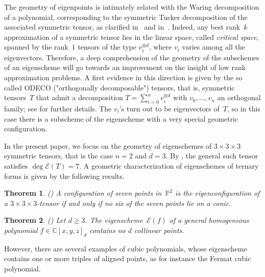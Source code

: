 \documentclass{amsart}
\theoremstyle{plain}
\newtheorem{theoremintro}{Theorem}
\theoremstyle{definition}
\newcommand{\C}{\mathbb{C}}
\newcommand{\p}{\mathbb{P}}
\newcommand{\Eig}[1]{\mathcal{E}\!\left( {#1} \right)}
\begin{document}
The geometry of eigenpoints is intimately related with the Waring decomposition of a polynomial,
corresponding to the symmetric Tucker decomposition of the associated symmetric tensor,
as clarified in~\cite{DOT} and in~\cite{Ott}. 
Indeed, any best rank~$k$ approximation of a symmetric tensor lies in the linear space, 
called \emph{critical space}, spanned by the rank~$1$ tensors of the type $v_i ^{\otimes d}$, where $v_i$ varies among all the eigenvectors. 
Therefore, a deep comprehension of the geometry of the subschemes of an eigenscheme will
go towards an improvement on the insight of low rank approximation problems. 
A first evidence in this direction is given by the so called ODECO ("orthogonally decomposable") tensors, 
that is, symmetric tensors~$T$ that admit a decomposition
$T = \sum _{i=0}^n v_i ^{\otimes d}$ with $v_0, \dotsc, v_n$ an orthogonal family; see \cite{Rob, BDHE} for further details.
The $v_i$'s turn out to be eigenvectors of~$T$, so in this case there is a subscheme of the eigenscheme with a very special geometric configuration.

 In the present paper, we focus on the geometry of eigenschemes of $3\times 3 \times 3$ symmetric tensors, that is the case $n=2$ and $d=3$. 
 By , the general such tensor satisfies $\deg \Eig{T}=7$.
 A geometric characterization of eigenschemes of ternary forms is given by the following results.

\begin{theoremintro}(\cite[Theorem 5.1]{ASS})
A configuration of seven points in~$\p^2$ is the eigenconfiguration
of a $3 \times 3 \times 3$-tensor if and only if no six of the seven points lie on a conic.
\end{theoremintro}

\begin{theoremintro}(\cite[Theorem 5.7]{BGV})
\label{thm:general_no_d_collinear}
Let $d \ge 3$. The eigenscheme~$\Eig{f}$ of a general homogeneous polynomial $f \in \C[x, y, z]_d$ contains no $d$ collinear points.
\end{theoremintro}

However, there are several examples of cubic polynomials, whose eigenscheme contains one or more triples of aligned points, as for instance the Fermat cubic polynomial.
\end{document}
